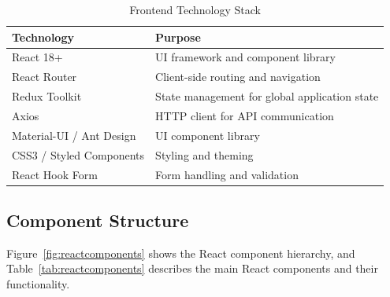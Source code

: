 \documentclass[12pt,a4paper]{article}
\begin{document}
\begin{table}[H]
\centering
\caption{Frontend Technology Stack}
\label{tab:frontendtech}
\begin{tabularx}{\textwidth}{|l|X|}
\hline
\textbf{Technology} & \textbf{Purpose} \\
\hline
React 18+ & UI framework and component library \\
\hline
React Router & Client-side routing and navigation \\
\hline
Redux Toolkit & State management for global application state \\
\hline
Axios & HTTP client for API communication \\
\hline
Material-UI / Ant Design & UI component library \\
\hline
CSS3 / Styled Components & Styling and theming \\
\hline
React Hook Form & Form handling and validation \\
\hline
\end{tabularx}
\end{table}

\subsection{Component Structure}
Figure~\ref{fig:reactcomponents} shows the React component hierarchy, and Table~\ref{tab:reactcomponents} describes the main React components and their functionality.
\end{document}
